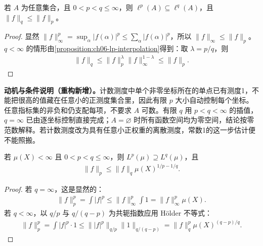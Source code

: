 \documentclass[../../main.tex]{subfiles}
\begin{document}
\begin{proposition}\label{proposition:ch06-sequence-inclusion}
若 $A$ 为任意集合，且 $0<p<q\leqslant\infty$，则 $\ell^p(A)\subseteq\ell^q(A)$，且 $\|f\|_q\leqslant\|f\|_p$。
\end{proposition}
\begin{proof}
显然 $\|f\|_\infty^p=\sup_\alpha|f(\alpha)|^p\leqslant\sum_\alpha|f(\alpha)|^p$，所以 $\|f\|_\infty\leqslant\|f\|_p$。$q<\infty$ 的情形由\cref{proposition:ch06-lp-interpolation}得到：取 $\lambda=p/q$，则
\begin{align*}
\|f\|_q\leqslant\|f\|_p^\lambda\|f\|_\infty^{1-\lambda}\leqslant\|f\|_p.
\end{align*}
\end{proof}
\begin{remark}
\textbf{动机与条件说明（重构新增）。}计数测度中单个非零坐标所在的单点已有测度1，不能把很高的值藏在任意小的正测度集合里，因此有限 $p$ 大小自动控制每个坐标。任意指标集的非负和仍支配每项，不要求 $A$ 可数。有限 $q$ 用 $p<q<\infty$ 的插值，$q=\infty$ 已由逐坐标控制直接完成；$A=\varnothing$ 时所有函数空间均为零空间，结论按零范数解释。若计数测度改为具有任意小正权重的离散测度，常数1的这一步估计便不能照搬。
\end{remark}
\begin{proposition}\label{proposition:ch06-finite-measure-inclusion}
若 $\mu(X)<\infty$ 且 $0<p<q\leqslant\infty$，则 $L^p(\mu)\supseteq L^q(\mu)$，且
\begin{align*}
\|f\|_p\leqslant\|f\|_q\mu(X)^{1/p-1/q}.
\end{align*}
\end{proposition}
\begin{proof}
若 $q=\infty$，这是显然的：
\begin{align*}
\|f\|_p^p=\int|f|^p\leqslant\|f\|_\infty^p\int1
=\|f\|_\infty^p\mu(X).
\end{align*}
若 $q<\infty$，以 $q/p$ 与 $q/(q-p)$ 为共轭指数应用 Hölder 不等式：
\begin{align*}
\|f\|_p^p=\int|f|^p\cdot1
\leqslant\bigl\||f|^p\bigr\|_{q/p}\|1\|_{q/(q-p)}
=\|f\|_q^p\mu(X)^{(q-p)/q}.
\end{align*}
\end{proof}
\end{document}
